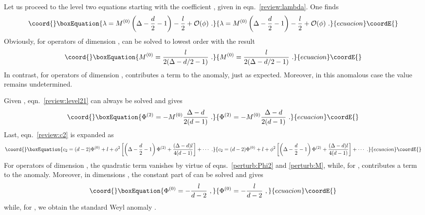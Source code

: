 \documentclass[a4paper,12pt]{article}
\begin{document}
Let us proceed to the level two equations starting with the
coefficient \coordHE{}, given in eqn.\ \eqref{review:lambda}. One finds
\begin{equation}\coord{}\boxEquation{
\label{perturb:lambda}
  \lambda = M^{(0)} \left( \Delta-\frac{d}2 -1 \right) - \frac{l}2
  +\mathcal{O}(\phi)~.
}{
\lambda = M^{(0)} \left( \Delta-\frac{d}2 -1 \right) - \frac{l}2
  +\mathcal{O}(\phi)~.
}{ecuacion}\coordE{}\end{equation}
Obviously, for operators of dimension \coordHE{},
\coordHE{} can be solved to lowest order with the result
\begin{equation}\coord{}\boxEquation{
\label{perturb:M}
  M^{(0)} = \frac{l}{2(\Delta-d/2-1)}~.
}{
M^{(0)} = \frac{l}{2(\Delta-d/2-1)}~.
}{ecuacion}\coordE{}\end{equation}
In contrast, for operators of dimension \coordHE{}, \myHighlight{$\lambda$}\coordHE{}
contributes a term \coordHE{} to the
anomaly, just as expected. Moreover, in this anomalous case the value
\coordHE{} remains undetermined.

Given \coordHE{}, eqn.\ \eqref{review:level21} can always be solved and gives
\begin{equation}\coord{}\boxEquation{
\label{perturb:Phi2}
  \Phi^{(2)} = -M^{(0)} \frac{\Delta-d}{2(d-1)}~.
}{
\Phi^{(2)} = -M^{(0)} \frac{\Delta-d}{2(d-1)}~.
}{ecuacion}\coordE{}\end{equation}
Last, eqn.\ \eqref{review:c2} is expanded as
\begin{equation}\coord{}\boxEquation{
\label{perturb:c2}
  c_2 = (d-2) \Phi^{(0)} +l + \phi^2 \left[
  \left(\Delta-\frac{d}2-1\right) \Phi^{(2)} + \frac{(\Delta-d)l}{4(d-1)} 
  \right] +\cdots~.
}{
c_2 = (d-2) \Phi^{(0)} +l + \phi^2 \left[
  \left(\Delta-\frac{d}2-1\right) \Phi^{(2)} + \frac{(\Delta-d)l}{4(d-1)} 
  \right] +\cdots~.
}{ecuacion}\coordE{}\end{equation}
For operators of dimension \coordHE{}, the quadratic term vanishes
by virtue of eqns.\ \eqref{perturb:Phi2} and \eqref{perturb:M}, while, for
\coordHE{}, \coordHE{} contributes a term \coordHE{} to
the anomaly.
Moreover, in dimensions \coordHE{}, the constant part of \coordHE{} can be
solved and gives
\begin{equation}\coord{}\boxEquation{
\label{perturb:Phi0} 
  \Phi^{(0)} = -\frac{l}{d-2}~,
}{
\Phi^{(0)} = -\frac{l}{d-2}~,
}{ecuacion}\coordE{}\end{equation}
while, for \coordHE{}, we obtain the standard Weyl anomaly \coordHE{}. 
\end{document}
